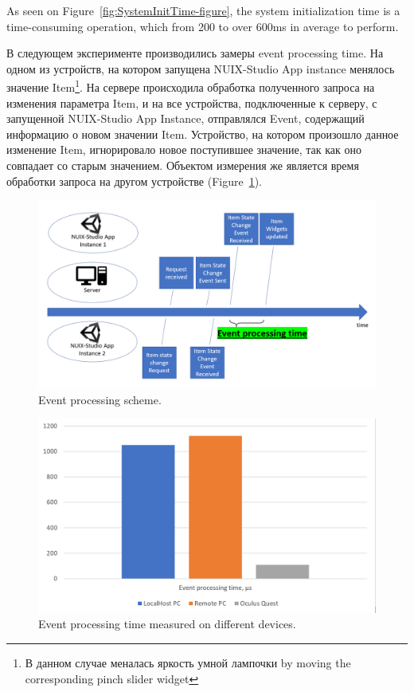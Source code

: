 As seen on Figure~\ref{fig:SystemInitTime-figure}, the system initialization time is a time-consuming operation, which from 200 to over 600ms in average to perform.

В следующем эксперименте производились замеры event processing time. На одном из устройств, на котором запущена NUIX-Studio App instance менялось значение Item\footnote{В данном случае меналась яркость умной лампочки by moving the corresponding pinch slider widget}. На сервере происходила обработка полученного запроса на изменения параметра Item, и на все устройства, подключенные к серверу, с запущенной NUIX-Studio App Instance, отправлялся Event, содержащий информацию о новом значении Item. Устройство, на котором произошло данное изменение Item, игнорировало новое поступившее значение, так как оно совпадает со старым значением. Объектом измерения же является время обработки запроса на другом устройстве (Figure~\ref{fig:EventProcessingScheme-figure}).

\begin{figure}
  \centering
  \includegraphics[width=0.9\linewidth]{figures/EventProcessingScheme.png}
  \caption{Event processing scheme.}
  \label{fig:EventProcessingScheme-figure}
\end{figure}

\begin{figure}
  \centering
  \includegraphics[width=0.9\linewidth]{figures/EventProcessingTime.png}
  \caption{Event processing time measured on different devices.}
  \label{fig:EventProcessingTime-figure}
\end{figure}

